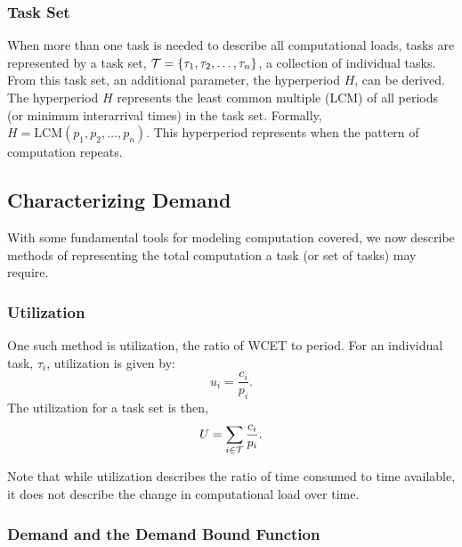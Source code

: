 \subsubsection{Task Set}

When more than one task is needed to describe all computational loads, tasks are represented by a task set, $\mathcal{T} = \{\tau_1, \tau_2, \dots, \tau_n\}$, a collection of individual tasks.
From this task set, an additional parameter, the hyperperiod $H$, can be derived.
The hyperperiod $H$ represents the least common multiple (LCM) of all periods (or minimum interarrival times) in  the task set.
Formally, $H = \text{LCM}(p_1, p_2, \dots, p_n)$.
This hyperperiod represents when the pattern of computation repeats.

\subsection{Characterizing Demand}

With some fundamental tools for modeling computation covered, we now describe methods of representing the total computation a task (or set of tasks) may require. 

\subsubsection{Utilization}

One such method is utilization, the ratio of WCET to period.
For an individual task, $\tau_i$, utilization is given by:
\begin{equation}
    u_i = \frac{c_i}{p_i}.
\end{equation}
The utilization for a task set is then,
\begin{equation}
    U = \sum_{i \in \mathcal{T}} \frac{c_i}{p_i}.
\end{equation}

Note that while utilization describes the ratio of time consumed to time available, it does not describe the change in computational load over time.

\subsubsection{Demand and the Demand Bound Function}

